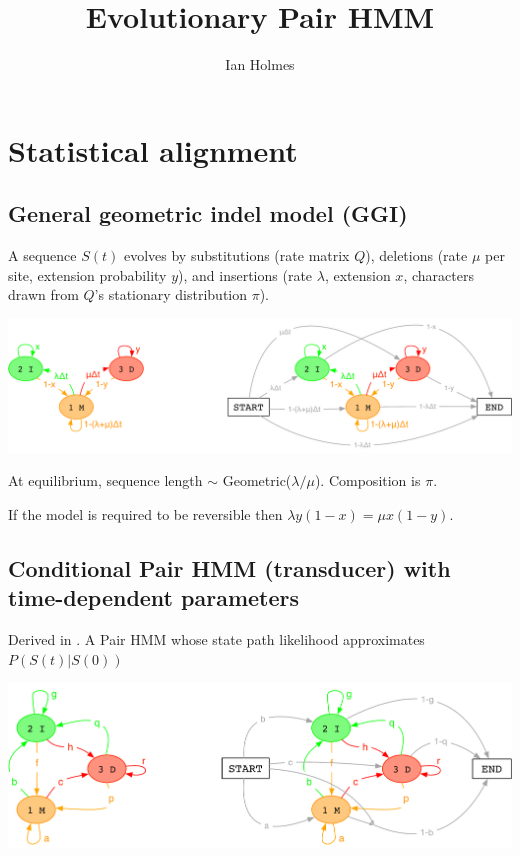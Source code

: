 \documentclass{article}
\title{Evolutionary Pair HMM}
\author{Ian Holmes}
\begin{document}

\section{Statistical alignment}

\subsection{General geometric indel model (GGI)}

A sequence $S(t)$ evolves by
substitutions (rate matrix $Q$),
deletions (rate $\mu$ per site, extension probability $y$),
and
insertions (rate $\lambda$, extension $x$,
characters drawn from $Q$'s stationary distribution $\pi$).

\includegraphics[width=\textwidth]{InstantHMM.pdf}

At equilibrium, sequence length $\sim$ Geometric($\lambda/\mu$). Composition is $\pi$.

If the model is required to be reversible then $\lambda y(1-x) = \mu x(1-y)$.

\subsection{Conditional Pair HMM (transducer) with time-dependent parameters}
Derived in \cite{Holmes2020}.
A Pair HMM whose state path likelihood approximates $P(S(t)|S(0))$

\includegraphics[width=\textwidth]{PairHMM.pdf}
\end{document}
